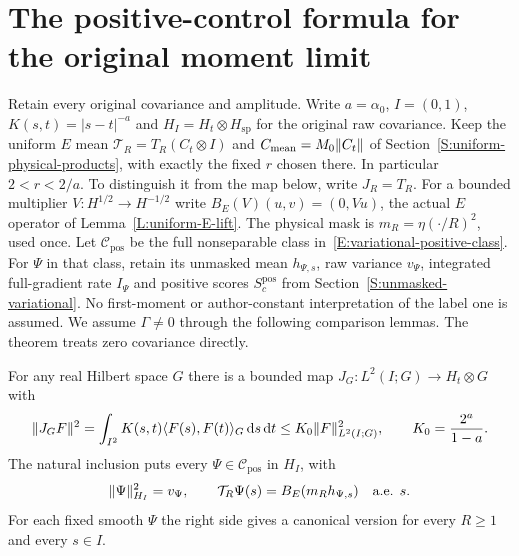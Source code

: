 \section{The positive-control formula for the original moment limit}
\label{S:intrinsic-second-moment}

Retain every original covariance and amplitude.
Write $a=\alpha_0$, $I=(0,1)$, $K(s,t)=|s-t|^{-a}$ and
$H_I=H_t\otimes H_{\mathrm{sp}}$ for the original raw covariance.
Keep the uniform $E$ mean $\mathcal T_R=T_R(C_t\otimes I)$ and
$C_{\rm mean}=M_0\|C_t\|$ of Section~\ref{S:uniform-physical-products},
with exactly the fixed $r$ chosen there. In particular $2<r<2/a$.
To distinguish it from the map below, write $J_R=T_R$.
For a bounded multiplier $V:H^{1/2}\to H^{-1/2}$ write
$B_E(V)(u,v)=(0,Vu)$, the actual $E$ operator of
Lemma~\ref{L:uniform-E-lift}.
The physical mask is $m_R=\eta(\cdot/R)^2$, used once.
Let $\mathcal C_{\mathrm{pos}}$ be the full nonseparable class
in~\eqref{E:variational-positive-class}.
For $\Psi$ in that class, retain its unmasked mean $h_{\Psi,s}$,
raw variance $v_\Psi$, integrated full-gradient rate $I_\Psi$ and
positive scores $S_c^{\mathrm{pos}}$ from
Section~\ref{S:unmasked-variational}.
No first-moment or author-constant interpretation of the label one
is assumed.
We assume $\Gamma\ne0$ through the following comparison lemmas.
The theorem treats zero covariance directly.

\begin{lemma}
  \label{L:positive-raw-embedding}
  For any real Hilbert space $G$ there is a bounded map
  $J_G:L^2(I;G)\to H_t\otimes G$ with
  \begin{equation}\label{E:positive-bochner-inclusion}
    \|J_GF\|^2
    =\int_{I^2}K(s,t)\langle F(s),F(t)\rangle_G\,\mathrm{d} s\,\mathrm{d} t
    \le K_0\|F\|_{L^2(I;G)}^2,\qquad K_0=\frac{2^a}{1-a}.
  \end{equation}
  The natural inclusion puts every $\Psi\in\mathcal C_{\mathrm{pos}}$
  in $H_I$, with
  \begin{equation}\label{E:positive-raw-mean}
    \|\Psi\|_{H_I}^2=v_\Psi,\qquad
    \mathcal T_R\Psi(s)=B_E(m_Rh_{\Psi,s})\quad\hbox{a.e. }s.
  \end{equation}
  For each fixed smooth $\Psi$ the right side gives a canonical
  version for every $R\ge1$ and every $s\in I$.
\end{lemma}

